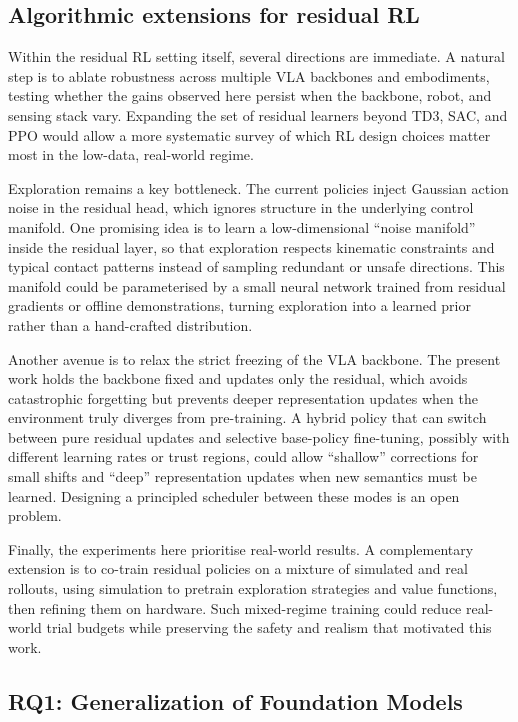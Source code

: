 \subsection{Algorithmic extensions for residual RL}

Within the residual RL setting itself, several directions are immediate. A natural step is to ablate robustness across multiple VLA backbones and embodiments, testing whether the gains observed here persist when the backbone, robot, and sensing stack vary. Expanding the set of residual learners beyond TD3, SAC, and PPO would allow a more systematic survey of which RL design choices matter most in the low-data, real-world regime.

Exploration remains a key bottleneck. The current policies inject Gaussian action noise in the residual head, which ignores structure in the underlying control manifold. One promising idea is to learn a low-dimensional “noise manifold” inside the residual layer, so that exploration respects kinematic constraints and typical contact patterns instead of sampling redundant or unsafe directions. This manifold could be parameterised by a small neural network trained from residual gradients or offline demonstrations, turning exploration into a learned prior rather than a hand-crafted distribution.

Another avenue is to relax the strict freezing of the VLA backbone. The present work holds the backbone fixed and updates only the residual, which avoids catastrophic forgetting but prevents deeper representation updates when the environment truly diverges from pre-training. A hybrid policy that can switch between pure residual updates and selective base-policy fine-tuning, possibly with different learning rates or trust regions, could allow “shallow” corrections for small shifts and “deep” representation updates when new semantics must be learned. Designing a principled scheduler between these modes is an open problem.

Finally, the experiments here prioritise real-world results. A complementary extension is to co-train residual policies on a mixture of simulated and real rollouts, using simulation to pretrain exploration strategies and value functions, then refining them on hardware. Such mixed-regime training could reduce real-world trial budgets while preserving the safety and realism that motivated this work.

\subsection{RQ1: Generalization of Foundation Models}

